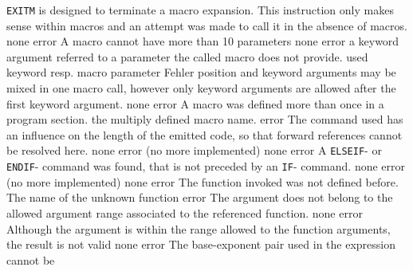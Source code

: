 \documentclass[12pt,twoside]{report}
\newcommand{\tty}[1]{{\tt #1}}
\begin{document}
\begin{description}
               {\tty{EXITM} is designed to terminate a macro expansion.  This
                instruction only makes sense within macros and an attempt
                was made to call it in the absence of macros.}
               {none}
               {error}
               {A macro cannot have more than 10 parameters}
               {none}
               {error}
               {a keyword argument referred to a parameter the
                called macro does not provide.}
               {used keyword resp. macro parameter}
               {Fehler}
               {position and keyword arguments  may be mixed in
                one macro call, however only keyword arguments
                are allowed after the first keyword argument.}
               {none}
               {error}
               {A macro was defined more than once in a program section.}
               {the multiply defined macro name.}
               {error}
               {The command used has an influence on the length of the
                emitted code, so that forward references cannot be resolved
                here.}
               {none}
               {error}
               {(no more implemented)}
               {none}
               {error}
               {A \tty{ELSEIF}- or \tty{ENDIF}- command was found, that is not preceded
                by an \tty{IF}- command.}
               {none}
               {error}
               {(no more implemented)}
               {none}
               {error}
               {The function invoked was not defined before.}
               {The name of the unknown function}
               {error}
               {The argument does not belong to the allowed argument range
                associated to the referenced function.}
               {none}
               {error}
               {Although the argument is within the range allowed to the
                function arguments, the result is not valid}
               {none}
               {error}
               {The base-exponent pair used in the expression cannot be
}
\end{description}
\end{document}
